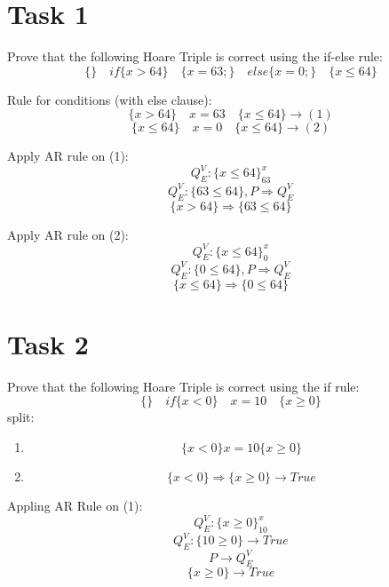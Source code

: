 \documentclass{assignment}
\begin{document}


\section*{Task 1}
Prove that the following Hoare Triple is correct using the if-else rule:
\[\{\}\quad if \{x>64\} \quad \{x=63;\} \quad  else \{x=0;\} \quad \{ x \leq 64\}\]

Rule for conditions (with else clause):
\[\{x>64\} \quad x =63 \quad \{x \leq 64 \} \rightarrow (1)\] 
\[\{x \leq 64 \}\quad x = 0 \quad \{ x \leq 64\} \rightarrow (2)\]

Apply AR rule on (1):
\[Q_E^V: \{x \leq 64 \}_{63}^x \]
\[Q_E^V: \{63 \leq 64\}, P \Rightarrow Q_E^V\]
\[\{x>64\} \Rightarrow \{63 \leq 64\}\]

Apply AR rule on (2):
\[Q_E^V: \{x \leq 64 \}_{0}^x \]
\[Q_E^V: \{0 \leq 64\}, P \Rightarrow Q_E^V\]
\[\{ x \leq 64\} \Rightarrow \{0 \leq 64\}\]

\section{Task 2}
Prove that the following Hoare Triple is correct using the if rule:
\[\{\} \quad if\{x<0\} \quad x = 10 \quad \{x \geq 0\}\]
split:
\begin{enumerate}
    \item \[\{x<0\} x = 10 \{x \geq 0\}\]
    \item \[\{x<0\} \Rightarrow \{x \geq 0\} \rightarrow True\]
\end{enumerate}
Appling AR Rule on (1):
\[Q_E^V: \{x \geq 0\}_{10}^x\]
\[Q_E^V: \{10 \geq 0\} \rightarrow True\]
\[P \rightarrow Q_E^V\]
\[\{x \geq 0\} \rightarrow True\]


        
\end{document}
